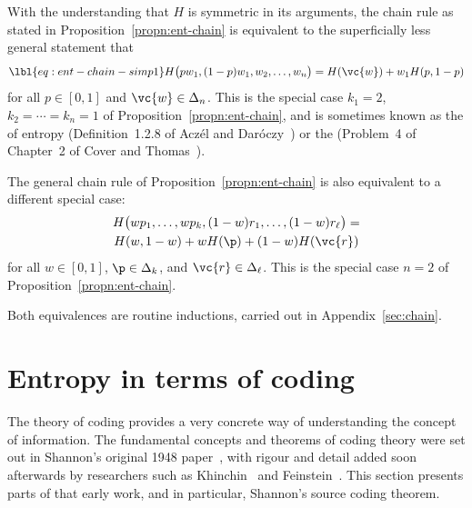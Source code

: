 \begin{remark}
With the understanding that $H$ is symmetric in its arguments, the
chain%
%
%
rule as stated in Proposition~\ref{propn:ent-chain} is equivalent to the
superficially less general statement that
% 
\begin{equation}
\lbl{eq:ent-chain-simp1}
H\bigl(pw_1, (1 - p)w_1, w_2, \ldots, w_n\bigr)
=
H(\vc{w}) + w_1 H(p, 1 - p)
\end{equation}
% 
for all $p \in [0, 1]$ and $\vc{w} \in \Delta_n$.  This is the special case
$k_1 = 2$, $k_2 = \cdots = k_n = 1$ of Proposition~\ref{propn:ent-chain},
and is sometimes known as the  of entropy
(Definition~1.2.8 of Acz\'el and Dar\'oczy~\cite{AcDa}) or the
 (Problem~4 of Chapter~2 of Cover and Thomas~\cite{CoTh1}).

The general chain rule of Proposition~\ref{propn:ent-chain} is also
equivalent to a different special case:
\begin{multline*}
H\bigl(wp_1, \ldots, wp_k, (1 - w)r_1, \ldots, (1 - w)r_\ell\bigr)
=\\
H(w, 1 - w) + w H(\p) + (1 - w) H(\vc{r})
\end{multline*}
for all $w \in [0, 1]$, $\p \in \Delta_k$, and $\vc{r} \in \Delta_\ell$.
This is the special case $n = 2$ of Proposition~\ref{propn:ent-chain}.

Both equivalences are routine inductions, carried out in
Appendix~\ref{sec:chain}.
\end{remark}


\section{Entropy in terms of coding}


The theory of coding provides a very concrete way of understanding the
concept of information.  The fundamental concepts and theorems of coding
theory were set out in Shannon's%
%
% 
original 1948 paper~\cite{ShanMTC}, with rigour and detail added soon
afterwards by researchers such as Khinchin~\cite{Khin} and
Feinstein~\cite{Fein}.  This section presents parts of that early work, and
in particular, Shannon's source coding theorem.

